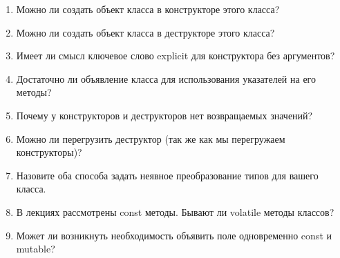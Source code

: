 \documentclass[a4paper,12pt,oneside]{article}
\newif\ifanswers
\begin{document}
\begin{enumerate}
\item Можно ли создать объект класса в конструкторе этого класса?
\item Можно ли создать объект класса в деструкторе этого класса?
\item Имеет ли смысл ключевое слово explicit для конструктора без аргументов?
\item Достаточно ли объявление класса для использования указателей на его методы?
\item Почему у конструкторов и деструкторов нет возвращаемых значений?
\item Можно ли перегрузить деструктор (так же как мы перегружаем конструкторы)?
\item Назовите оба способа задать неявное преобразование типов для вашего класса.
\item В лекциях рассмотрены const методы. Бывают ли volatile методы классов?

\ifanswers
Ответ: Да. Мало того, именно они должны вызываться для volatile объектов класса.
\fi

\item Может ли возникнуть необходимость объявить поле одновременно const и mutable?

\ifanswers
Ответ: да, в первую очередь это ситуации const mutable pointer. Несмотря на модфиикатор const, сам указатель может менятся, а значит может быть смысл сделать его mutable.
\fi


\end{enumerate}
\end{document}

